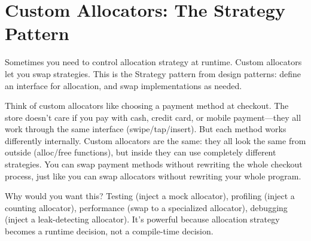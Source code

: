 \section{Custom Allocators: The Strategy Pattern}

Sometimes you need to control allocation strategy at runtime. Custom allocators let you swap strategies. This is the Strategy pattern from design patterns: define an interface for allocation, and swap implementations as needed.

Think of custom allocators like choosing a payment method at checkout. The store doesn't care if you pay with cash, credit card, or mobile payment—they all work through the same interface (swipe/tap/insert). But each method works differently internally. Custom allocators are the same: they all look the same from outside (alloc/free functions), but inside they can use completely different strategies. You can swap payment methods without rewriting the whole checkout process, just like you can swap allocators without rewriting your whole program.

Why would you want this? Testing (inject a mock allocator), profiling (inject a counting allocator), performance (swap to a specialized allocator), debugging (inject a leak-detecting allocator). It's powerful because allocation strategy becomes a runtime decision, not a compile-time decision.

